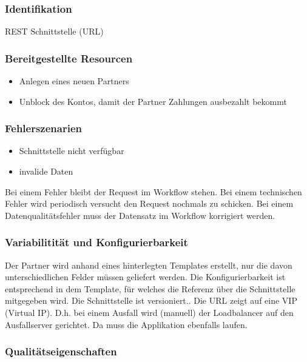 \subsubsection{Identifikation}

REST Schnittstelle (URL)

\subsubsection{Bereitgestellte Resourcen}

\begin{itemize}
 \item Anlegen eines neuen Partners
 \item Unblock des Kontos, damit der Partner Zahlungen ausbezahlt bekommt
\end{itemize}

\subsubsection{Fehlerszenarien}

\begin{itemize}
 \item Schnittstelle nicht verfügbar
 \item invalide Daten
\end{itemize}
Bei einem Fehler bleibt der Request im Workflow stehen. Bei einem technischen Fehler wird periodisch versucht den Request nochmals zu schicken. Bei einem Datenqualitätsfehler muss der Datensatz im Workflow korrigiert werden.

\subsubsection{Variabilitität und Konfigurierbarkeit}

Der Partner wird anhand eines hinterlegten Templates erstellt, nur die davon unterschiedlichen Felder müssen geliefert werden. Die Konfigurierbarkeit ist entsprechend in dem Template, für welches die Referenz über die Schnittstelle mitgegeben wird. Die Schnittstelle ist versioniert..
Die URL zeigt auf eine VIP (Virtual IP). D.h. bei einem Ausfall wird (manuell) der Loadbalancer auf den Ausfallserver gerichtet. Da muss die Applikation ebenfalls laufen.

\subsubsection{Qualitätseigenschaften}

